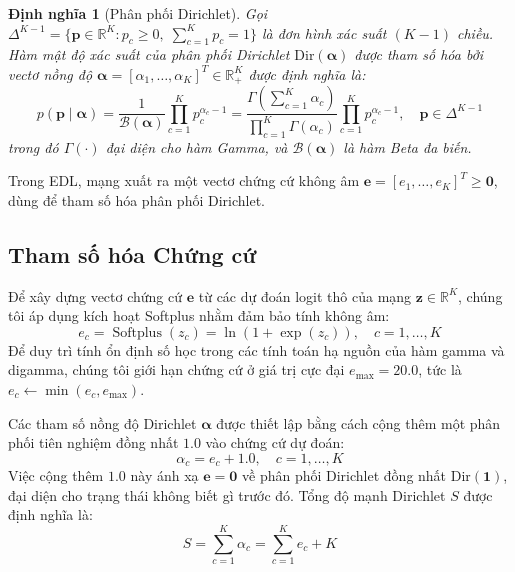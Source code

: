 \documentclass[11pt]{article}
\newtheorem{definition}{Định nghĩa}
\newcommand{\Dir}{\text{Dir}}
\newcommand{\R}{\mathbb{R}}
\DeclareMathOperator{\softplus}{Softplus}
\begin{document}
\begin{definition}[Phân phối Dirichlet]
Gọi $\Delta^{K-1} = \{\bm{p} \in \R^K : p_c \ge 0,\; \sum_{c=1}^K p_c = 1\}$ là đơn hình xác suất $(K{-}1)$ chiều. Hàm mật độ xác suất của phân phối Dirichlet $\Dir(\bm{\alpha})$ được tham số hóa bởi vectơ nồng độ $\bm{\alpha} = [\alpha_1, \dots, \alpha_K]^T \in \R^K_+$ được định nghĩa là:
\begin{equation}\label{eq:dirichlet_pdf}
    p(\bm{p} \mid \bm{\alpha}) = \frac{1}{\mathcal{B}(\bm{\alpha})} \prod_{c=1}^K p_c^{\alpha_c - 1} = \frac{\Gamma\!\left(\sum_{c=1}^K \alpha_c\right)}{\prod_{c=1}^K \Gamma(\alpha_c)} \prod_{c=1}^K p_c^{\alpha_c - 1}, \quad \bm{p} \in \Delta^{K-1}
\end{equation}
trong đó $\Gamma(\cdot)$ đại diện cho hàm Gamma, và $\mathcal{B}(\bm{\alpha})$ là hàm Beta đa biến.
\end{definition}

Trong EDL, mạng xuất ra một vectơ chứng cứ không âm $\bm{e} = [e_1, \dots, e_K]^T \ge \bm{0}$, dùng để tham số hóa phân phối Dirichlet.

\subsection{Tham số hóa Chứng cứ}\label{subsec:evidence}

Để xây dựng vectơ chứng cứ $\bm{e}$ từ các dự đoán logit thô của mạng $\bm{z} \in \R^K$, chúng tôi áp dụng kích hoạt Softplus nhằm đảm bảo tính không âm:
\begin{equation}\label{eq:evidence}
    e_c = \softplus(z_c) = \ln(1 + \exp(z_c)), \quad c = 1, \dots, K
\end{equation}
Để duy trì tính ổn định số học trong các tính toán hạ nguồn của hàm gamma và digamma, chúng tôi giới hạn chứng cứ ở giá trị cực đại $e_{\max} = 20.0$, tức là $e_c \leftarrow \min(e_c, e_{\max})$.

Các tham số nồng độ Dirichlet $\bm{\alpha}$ được thiết lập bằng cách cộng thêm một phân phối tiên nghiệm đồng nhất $1.0$ vào chứng cứ dự đoán:
\begin{equation}\label{eq:alpha}
    \alpha_c = e_c + 1.0, \quad c = 1, \dots, K
\end{equation}
Việc cộng thêm $1.0$ này ánh xạ $\bm{e} = \bm{0}$ về phân phối Dirichlet đồng nhất $\Dir(\bm{1})$, đại diện cho trạng thái không biết gì trước đó. Tổng độ mạnh Dirichlet $S$ được định nghĩa là:
\begin{equation}\label{eq:strength}
    S = \sum_{c=1}^K \alpha_c = \sum_{c=1}^K e_c + K
\end{equation}
\end{document}
